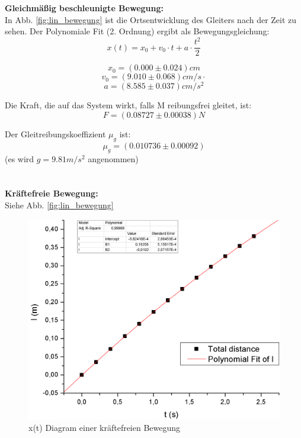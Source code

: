 \documentclass[12pt,a4paper]{article}
\begin{document}
\begin{multicols}{2}

\noindent \textbf{Gleichmäßig beschleunigte Bewegung:}\\

In Abb. \ref{fig:lin_bewegung} ist die Ortsentwicklung des Gleiters nach der Zeit zu sehen.
Der Polynomiale Fit (2. Ordnung) ergibt als Bewegungsgleichung:
$$x(t)=x_0 + v_0 \cdot t + a \cdot \frac{t^2}{2}$$

$$x_0=(0.000 \pm 0.024)cm$$
$$v_0=(9.010 \pm 0.068)cm/s \cdot $$
$$a=( 8.585 \pm 0.037) cm/s^2 $$

Die Kraft, die auf das System wirkt, falls M reibungsfrei gleitet, ist:
$$F= (0.08727 \pm 0.00038) N$$

Der Gleitreibungskoeffizient $\mu_g$ ist:
$$\mu_g = (0.010736 \pm 0.00092)$$
(es wird $g=9.81m/s^2$ angenommen)\\
\\
\\


\noindent \textbf{Kräftefreie Bewegung:}\\
Siehe Abb. \ref{fig:lin_bewegung}\\

\end{multicols}
\begin{figure}[H]
	\centering
	\includegraphics[scale=0.6]{./figure/x(t)_diagram_freie_bew.png}
	\caption{x(t) Diagram einer kräftefreien Bewegung}
	\label{fig:x_t_freie_bew}
\end{figure}
\end{document}
